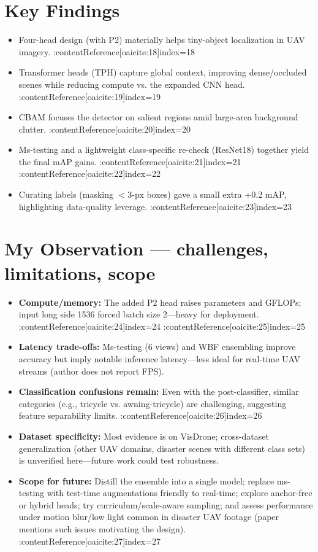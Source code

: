 \documentclass[11pt]{article}
\begin{document}
\section*{Key Findings}
\begin{itemize}
  \item Four-head design (with P2) materially helps tiny-object localization in UAV imagery. :contentReference[oaicite:18]{index=18}
  \item Transformer heads (TPH) capture global context, improving dense/occluded scenes while reducing compute vs. the expanded CNN head. :contentReference[oaicite:19]{index=19}
  \item CBAM focuses the detector on salient regions amid large-area background clutter. :contentReference[oaicite:20]{index=20}
  \item Ms-testing and a lightweight class-specific re-check (ResNet18) together yield the final mAP gains. :contentReference[oaicite:21]{index=21} :contentReference[oaicite:22]{index=22}
  \item Curating labels (masking $<\!3$-px boxes) gave a small extra +0.2 mAP, highlighting data-quality leverage. :contentReference[oaicite:23]{index=23}
\end{itemize}

\section*{My Observation — challenges, limitations, scope}
\begin{itemize}
  \item \textbf{Compute/memory:} The added P2 head raises parameters and GFLOPs; input long side 1536 forced batch size 2—heavy for deployment. :contentReference[oaicite:24]{index=24} :contentReference[oaicite:25]{index=25}
  \item \textbf{Latency trade-offs:} Ms-testing (6 views) and WBF ensembling improve accuracy but imply notable inference latency—less ideal for real-time UAV streams (author does not report FPS).
  \item \textbf{Classification confusions remain:} Even with the post-classifier, similar categories (e.g., tricycle vs. awning-tricycle) are challenging, suggesting feature separability limits. :contentReference[oaicite:26]{index=26}
  \item \textbf{Dataset specificity:} Most evidence is on VisDrone; cross-dataset generalization (other UAV domains, disaster scenes with different class sets) is unverified here—future work could test robustness.
  \item \textbf{Scope for future:} Distill the ensemble into a single model; replace ms-testing with test-time augmentations friendly to real-time; explore anchor-free or hybrid heads; try curriculum/scale-aware sampling; and assess performance under motion blur/low light common in disaster UAV footage (paper mentions such issues motivating the design). :contentReference[oaicite:27]{index=27}
\end{itemize}
\end{document}
